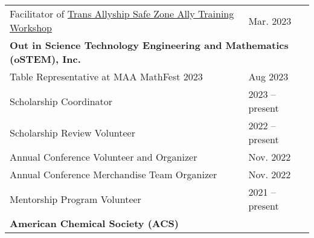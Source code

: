 \documentclass[letterpaper,11pt]{article}
\begin{document}
\begin{longtable}{@{}p{}l@{}}
  \hspace{3mm} Facilitator of \href{https://lgbtq.asee.org/ally-training/online-workshops/#:~:text=Safe\%20Zone\%20Ally\%20Training\%3A\%20Tans\%20Allyship}{Trans Allyship Safe Zone Ally Training Workshop}     & Mar. 2023        \\ [4pt]
  \multicolumn{2}{l}{\hspace{-3mm} \bf{Out in Science Technology Engineering and Mathematics (oSTEM), Inc.}}                                                                                                                         \\
  \hspace{3mm} Table Representative at MAA MathFest 2023                                                                                                                                                          & Aug 2023         \\
  \hspace{3mm} Scholarship Coordinator                                                                                                                                                                            & 2023 -- present  \\
  \hspace{3mm} Scholarship Review Volunteer                                                                                                                                                                       & 2022 -- present  \\
  \hspace{3mm} Annual Conference Volunteer and Organizer                                                                                                                                                          & Nov. 2022        \\
  \hspace{3mm} Annual Conference Merchandise Team Organizer                                                                                                                                                       & Nov. 2022        \\
  \hspace{3mm} Mentorship Program Volunteer                                                                                                                                                                       & 2021 -- present  \\ [4pt]
  \multicolumn{2}{l}{\hspace{-3mm} \bf{American Chemical Society (ACS)}}                                                                                                                                                             \\

\end{longtable}
\end{document}
